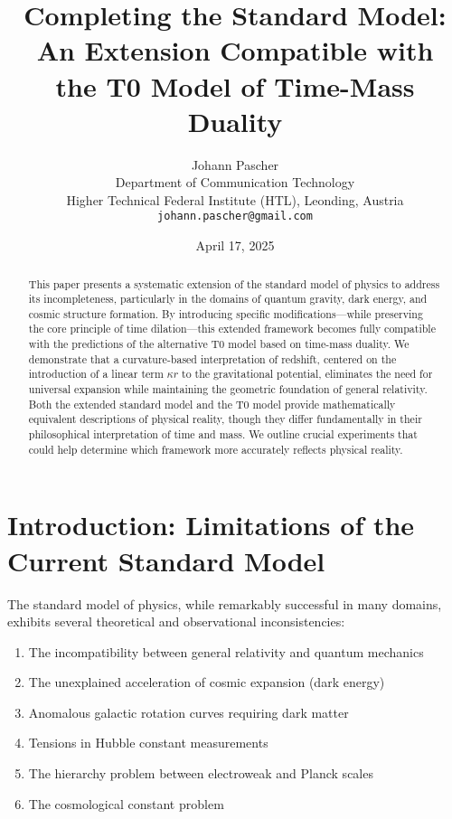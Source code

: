 \documentclass[12pt,a4paper]{article}
\title{Completing the Standard Model: An Extension Compatible with\\the T0 Model of Time-Mass Duality}
\author{Johann Pascher\\
	Department of Communication Technology\\
	Higher Technical Federal Institute (HTL), Leonding, Austria\\
	\texttt{johann.pascher@gmail.com}}
\date{April 17, 2025}
\begin{document}
	
	\maketitle
	
	\begin{abstract}
		This paper presents a systematic extension of the standard model of physics to address its incompleteness, particularly in the domains of quantum gravity, dark energy, and cosmic structure formation. By introducing specific modifications—while preserving the core principle of time dilation—this extended framework becomes fully compatible with the predictions of the alternative T0 model based on time-mass duality. We demonstrate that a curvature-based interpretation of redshift, centered on the introduction of a linear term $\kappa r$ to the gravitational potential, eliminates the need for universal expansion while maintaining the geometric foundation of general relativity. Both the extended standard model and the T0 model provide mathematically equivalent descriptions of physical reality, though they differ fundamentally in their philosophical interpretation of time and mass. We outline crucial experiments that could help determine which framework more accurately reflects physical reality.
	\end{abstract}
	
	\tableofcontents
	\newpage
	
	\section{Introduction: Limitations of the Current Standard Model}
	
	The standard model of physics, while remarkably successful in many domains, exhibits several theoretical and observational inconsistencies:
	
	\begin{enumerate}
		\item The incompatibility between general relativity and quantum mechanics
		\item The unexplained acceleration of cosmic expansion (dark energy)
		\item Anomalous galactic rotation curves requiring dark matter
		\item Tensions in Hubble constant measurements
		\item The hierarchy problem between electroweak and Planck scales
		\item The cosmological constant problem
	\end{enumerate}
	
\end{document}
